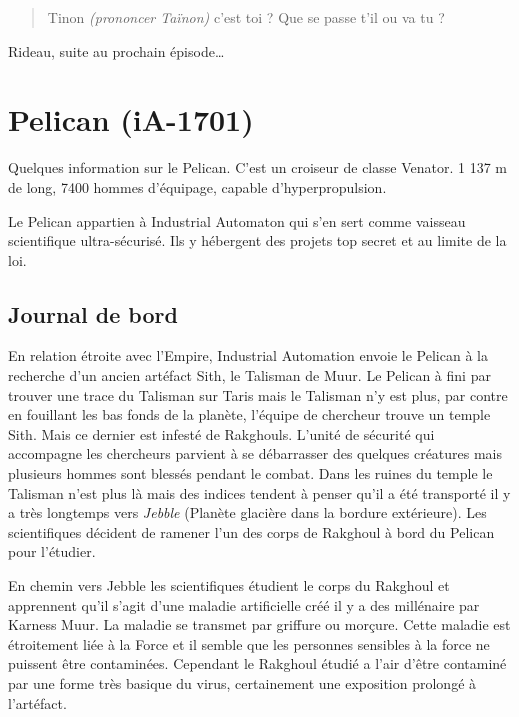 \documentclass{jdrp}
\begin{document}
\begin{quote}
	Tinon \emph{(prononcer Taïnon)} c'est toi ? Que se passe t'il ou va tu ?
\end{quote}

Rideau, suite au prochain épisode\ldots


\clearpage
\section{Pelican (iA-1701)}

Quelques information sur le Pelican. C'est un croiseur de classe Venator. 1 137 m de long, 7400 hommes d'équipage, capable d'hyperpropulsion.

Le Pelican appartien à Industrial Automaton qui s'en sert comme vaisseau scientifique ultra-sécurisé. Ils y hébergent des projets top secret et au limite de la loi.

\subsection{Journal de bord}
\label{sec:pelican-jdb}
En relation étroite avec l'Empire, Industrial Automation envoie le Pelican à la recherche d'un ancien artéfact Sith, le Talisman de Muur. Le Pelican à fini par trouver une trace du Talisman sur Taris mais le Talisman n'y est plus, par contre en fouillant les bas fonds de la planète, l'équipe de chercheur trouve un temple Sith. Mais ce dernier est infesté de Rakghouls. L'unité de sécurité qui accompagne les chercheurs parvient à se débarrasser des quelques créatures mais plusieurs hommes sont blessés pendant le combat. Dans les ruines du temple le Talisman n'est plus là mais des indices tendent à penser qu'il a été transporté il y a très longtemps vers \emph{Jebble} (Planète glacière dans la bordure extérieure). Les scientifiques décident de ramener l'un des corps de Rakghoul à bord du Pelican pour l'étudier.

En chemin vers Jebble les scientifiques étudient le corps du Rakghoul et apprennent qu'il s'agit d'une maladie artificielle créé il y a des millénaire par Karness Muur. La maladie se transmet par griffure ou morçure. Cette maladie est étroitement liée à la Force et il semble que les personnes sensibles à la force ne puissent être contaminées. Cependant le Rakghoul étudié a l'air d'être contaminé par une forme très basique du virus, certainement une exposition prolongé à l'artéfact.
\end{document}
